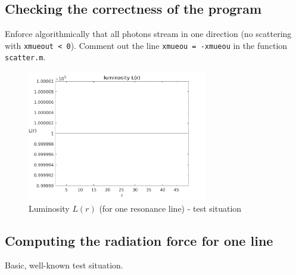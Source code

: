 \documentclass[../main/main.tex]{subfiles}
\begin{document}
\newpage
\subsection{Checking the correctness of the program}
Enforce algorithmically that all photons stream in one direction (no scattering with \texttt{xmueout < 0}). Comment out the line \texttt{xmueou = -xmueou} in the function \texttt{scatter.m}.

\begin{figure}[!htp]
\centering
\includegraphics[width=0.7\textwidth]{../../two_resonance_lines/figures/luminosity_one_resonance_line_one_direction.png}
\caption{Luminosity $L(r)$ (for one resonance line) - test situation}
\label{luminosity_one_resonance_line_test}
\end{figure}

\newpage
\subsection{Computing the radiation force for one line}
Basic, well-known test situation.
\end{document}

